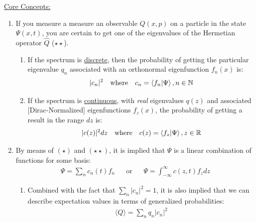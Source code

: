\documentclass{article}
\newcommand{\sheader}[1]{\underline{#1:}}
\begin{document}
    \sheader{Core Concepts}
    \begin{enumerate}
        \item  If you measure a measure an observable $Q(x, p)$ on a particle in the 
        state $\Psi(x, t)$, you are certain to get one of the eigenvalues of the 
        Hermetian operator $\hat{Q}$ ($\star \star$).
        \begin{enumerate}
            \item If the spectrum is \underline{discrete}, then the probability of getting 
            the particular eigenvalue $q_n$ associated with an orthonormal eigenfunction $f_n(x)$ is:
            \begin{align*}
                |c_n|^2 && \textrm{where} && c_n = \braket{f_n}{\Psi}, n \in \mathbb{N}
            \end{align*}
            \item If the spectrum is \underline{continuous}, with \textit{real} eigenvalues 
            $q(z)$ and associated [Dirac-Normalized] eigenfunctions $f_z(x)$, the probability of 
            getting a result in the range $dz$ is:
            \begin{align*}
                |c(z)|^2 dz && \textrm{where} && c(z) = \braket{f_z}{\Psi}, z \in \mathbb{R}
            \end{align*}
        \end{enumerate}
        \item By means of $(\star)$ and $(\star\star)$, it is implied that $\Psi$ is a linear 
        combination of functions for some basis:
        \begin{align*}
            \Psi = \sum_n c_n(t) f_n && \textrm{or} && \Psi = \int_{-\infty}^\infty c(z,t) f_z dz 
        \end{align*}
        \begin{enumerate}
            \item Combined with the fact that $\sum_n |c_n|^2 = 1$, it is also implied that we can describe expectation values in terms of 
            generalized probabilities:
            \begin{align*}
                \langle Q \rangle = \sum_n q_n |c_n|^2
            \end{align*}
        \end{enumerate}
    \end{enumerate}
\end{document}
